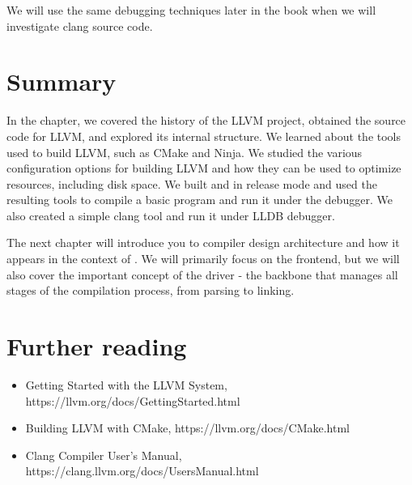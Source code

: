 We will use the same debugging techniques later in the book when we will
investigate clang source code.


\section{Summary}

In the chapter, we covered the history of the LLVM project, obtained the source
code for LLVM, and explored its internal structure. We learned about the tools
used to build LLVM, such as CMake and Ninja. We studied the various
configuration options for building LLVM and how they can be used to optimize
resources, including disk space. We built \clang and \lldb in release mode and
used  the resulting tools to compile a basic program and run it under the
debugger. We also created a simple clang tool and run it under LLDB debugger.

The next chapter will introduce you to compiler design architecture and how it
appears in the context of \clang. We will primarily focus on the \clang
frontend, but we will also cover the important concept of the \clang driver -
the backbone that manages all stages of the compilation process, from parsing to
linking.

\section{Further reading}
\begin{itemize}
\item Getting Started with the LLVM System,
  https://llvm.org/docs/GettingStarted.html
\item Building LLVM with CMake, https://llvm.org/docs/CMake.html
\item Clang Compiler User’s Manual, https://clang.llvm.org/docs/UsersManual.html
\end{itemize}
